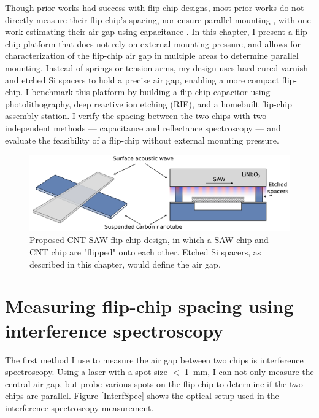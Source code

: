 \documentclass[double,12pt,1in,seploa]{beavtex}
\let\Oldsection\section
\renewcommand{\section}{\FloatBarrier\Oldsection}
\begin{document}
Though prior works had success with flip-chip designs, most prior works do not directly measure their flip-chip’s spacing, nor ensure parallel mounting \cite{chu_creation_2018,satzinger_quantum_2018, bennaceur_mechanical_2015}, with one work estimating their air gap using capacitance \cite{beukman_noninvasive_2015}. In this chapter, I present a flip-chip platform that does not rely on external mounting pressure, and allows for characterization of the flip-chip air gap in multiple areas to determine parallel mounting. Instead of springs or tension arms, my design uses hard-cured varnish and etched Si spacers to hold a precise air gap, enabling a more compact flip-chip. I benchmark this platform by building a flip-chip capacitor using photolithography, deep reactive ion etching (RIE), and a homebuilt flip-chip assembly station. I verify the spacing between the two chips with two independent methods — capacitance and reflectance spectroscopy — and evaluate the feasibility of a flip-chip without external mounting pressure.

\begin{figure}
    \includegraphics[width=1\textwidth]{Flip-chip intro figure.png}
    \caption{Proposed CNT-SAW flip-chip design, in which a SAW chip and CNT chip are "flipped" onto each other. Etched Si spacers, as described in this chapter, would define the air gap.}
    \label{flip-chip intro figure}
\end{figure}

\section{Measuring flip-chip spacing using interference spectroscopy}

The first method I use to measure the air gap between two chips is interference spectroscopy. Using a laser with a spot size $<$ \SI{1}{\milli\meter}, I can not only measure the central air gap, but probe various spots on the flip-chip to determine if the two chips are parallel. Figure \ref{InterfSpec} shows the optical setup used in the interference spectroscopy measurement.
\end{document}
